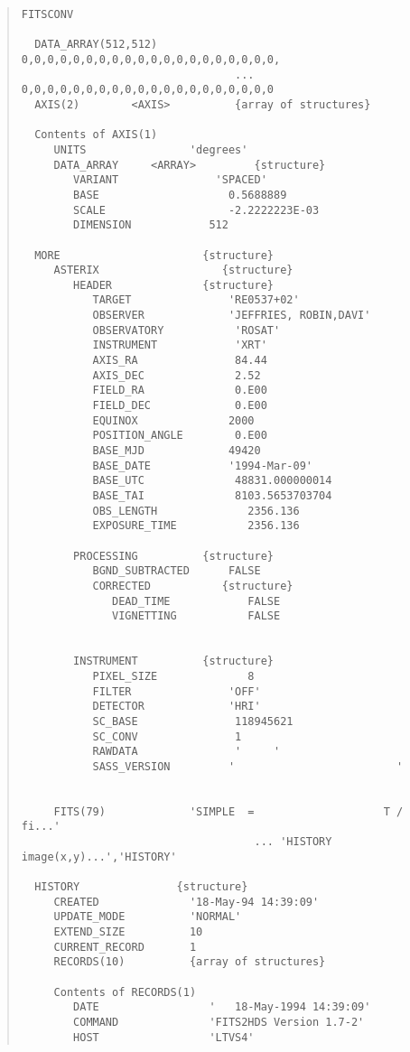 \documentclass{book}
\renewcommand{\_}{{\tt\char'137}}     %
\begin{document}
\begin{quote}\begin{verbatim}
FITSCONV

  DATA_ARRAY(512,512)     0,0,0,0,0,0,0,0,0,0,0,0,0,0,0,0,0,0,0,0,
                                 ... 0,0,0,0,0,0,0,0,0,0,0,0,0,0,0,0,0,0,0,0
  AXIS(2)        <AXIS>          {array of structures}

  Contents of AXIS(1)
     UNITS                'degrees'
     DATA_ARRAY     <ARRAY>         {structure}
        VARIANT               'SPACED'
        BASE                    0.5688889
        SCALE                   -2.2222223E-03
        DIMENSION            512

  MORE                      {structure}
     ASTERIX                   {structure}
        HEADER              {structure}
           TARGET               'RE0537+02'
           OBSERVER             'JEFFRIES, ROBIN,DAVI'
           OBSERVATORY           'ROSAT'
           INSTRUMENT            'XRT'
           AXIS_RA               84.44
           AXIS_DEC              2.52
           FIELD_RA              0.E00
           FIELD_DEC             0.E00
           EQUINOX              2000
           POSITION_ANGLE        0.E00
           BASE_MJD             49420
           BASE_DATE            '1994-Mar-09'
           BASE_UTC              48831.000000014
           BASE_TAI              8103.5653703704
           OBS_LENGTH              2356.136
           EXPOSURE_TIME           2356.136

        PROCESSING          {structure}
           BGND_SUBTRACTED      FALSE
           CORRECTED           {structure}
              DEAD_TIME            FALSE
              VIGNETTING           FALSE


        INSTRUMENT          {structure}
           PIXEL_SIZE              8
           FILTER               'OFF'
           DETECTOR             'HRI'
           SC_BASE               118945621
           SC_CONV               1
           RAWDATA               '     '
           SASS_VERSION         '                         '


     FITS(79)             'SIMPLE  =                    T / fi...'
                                    ... 'HISTORY     image(x,y)...','HISTORY'

  HISTORY               {structure}
     CREATED              '18-May-94 14:39:09'
     UPDATE_MODE          'NORMAL'
     EXTEND_SIZE          10
     CURRENT_RECORD       1
     RECORDS(10)          {array of structures}

     Contents of RECORDS(1)
        DATE                 '   18-May-1994 14:39:09'
        COMMAND              'FITS2HDS Version 1.7-2'
        HOST                 'LTVS4'
\end{verbatim}\end{quote}
\end{document}
